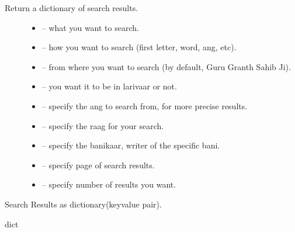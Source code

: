 \documentclass[letterpaper,10pt,english]{sphinxmanual}
\begin{document}
\sphinxAtStartPar
Return a dictionary of search results.
\begin{description}
\item[{}] \leavevmode\begin{itemize}
\item {} 
\sphinxAtStartPar
{}  – what you want to search.

\item {} 
\sphinxAtStartPar
{}  – how you want to search (first letter, word, ang, etc).

\item {} 
\sphinxAtStartPar
{}  – from where you want to search (by default, Guru Granth Sahib Ji).

\item {} 
\sphinxAtStartPar
{}  – you want it to be in larivaar or not.

\item {} 
\sphinxAtStartPar
{}  – specify the ang to search from, for more precise results.

\item {} 
\sphinxAtStartPar
{}  – specify the raag for your search.

\item {} 
\sphinxAtStartPar
{}  – specify the banikaar, writer of the specific bani.

\item {} 
\sphinxAtStartPar
{}  – specify page of search results.

\item {} 
\sphinxAtStartPar
{}  – specify number of results you want.

\end{itemize}

\end{description}

\sphinxAtStartPar
{}    Search Results as dictionary(key\sphinxhyphen{}value pair).

\sphinxAtStartPar
{}    dict
\end{document}
